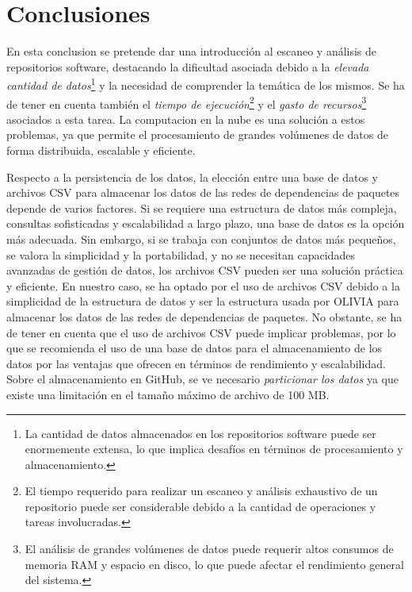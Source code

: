 

\section{Conclusiones}

En esta conclusion se pretende dar una introducción al escaneo y análisis de repositorios software, destacando la dificultad asociada debido
a la \emph{elevada cantidad de datos}\footnote{La cantidad de datos almacenados en los repositorios software puede ser enormemente extensa,
    lo que implica desafíos en términos de procesamiento y almacenamiento.} y la necesidad de comprender la temática de los mismos. Se ha de tener en cuenta
también el \emph{tiempo de ejecución}\footnote{El tiempo requerido para realizar un escaneo y análisis exhaustivo de un repositorio puede
    ser considerable debido a la cantidad de operaciones y tareas involucradas.} y el \emph{gasto de recursos}\footnote{El análisis de grandes
    volúmenes de datos puede requerir altos consumos de memoria RAM y espacio en disco, lo que puede afectar el rendimiento general del sistema.}
asociados a esta tarea. La computacion en la nube es una solución a estos problemas, ya que permite el procesamiento de grandes volúmenes de
datos de forma distribuida, escalable y eficiente.

Respecto a la persistencia de los datos, la elección entre una base de datos y archivos CSV para almacenar los datos de las redes de dependencias 
de paquetes depende de varios factores. Si se requiere una estructura de datos más compleja, consultas sofisticadas y escalabilidad a largo plazo, 
una base de datos es la opción más adecuada. Sin embargo, si se trabaja con conjuntos de datos más pequeños, se valora la simplicidad y la portabilidad, 
y no se necesitan capacidades avanzadas de gestión de datos, los archivos CSV pueden ser una solución práctica y eficiente.
En nuestro caso, se ha optado por el uso de archivos CSV debido a la simplicidad de la estructura de datos y ser la estructura usada por OLIVIA para
almacenar los datos de las redes de dependencias de paquetes. No obstante, se ha de tener en cuenta que el uso de archivos CSV puede implicar
problemas, por lo que se recomienda el uso de una base de datos para el almacenamiento de los datos por las ventajas que ofrecen en términos de 
rendimiento y escalabilidad.
Sobre el almacenamiento en GitHub, se ve necesario \emph{particionar los datos} ya que existe una limitación en el tamaño máximo de archivo de 100 MB.

